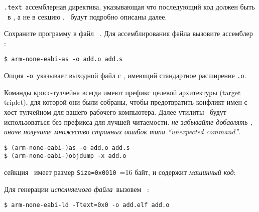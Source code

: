 \bigskip

\verb|.text|\ ассемблерная директива, указывающая что последующий код должен
быть \ в , а не в секцию
. \ будут подробно описаны далее.


Сохраните программу в файл \ .
Для ассемблирования файла вызовите ассемблер :

\begin{verbatim}
$ arm-none-eabi-as -o add.o add.s
\end{verbatim}

Опция \verb|-o|\ указывает выходной файл с , имеющий стандартное расширение \verb|.o|.

\begin{framed}
\noindent Команды кросс-тулчейна всегда имеют префикс целевой архитектуры
(target triplet), для которой они были собраны, чтобы предотвратить
конфликт имен с хост-тулчейном для вашего рабочего компьютера. Далее утилиты
\gnut\ будут использоваться без префикса для лучшей читаемости. \emph{не
забывайте добавлять , иначе получите множество странных
ошибок типа ``unexpected command''}.
\end{framed}

\begin{verbatim}
$ (arm-none-eabi-)as -o add.o add.s
$ (arm-none-eabi-)objdump -x add.o
\end{verbatim}

сейкция \ имеет размер \verb|Size=0x0010|\ =16 байт, и содержит
\emph{машинный код}:


\bigskip
Для генерации \emph{исполняемого файла}\ вызовем \ :

\begin{verbatim}
$ arm-none-eabi-ld -Ttext=0x0 -o add.elf add.o
\end{verbatim}


